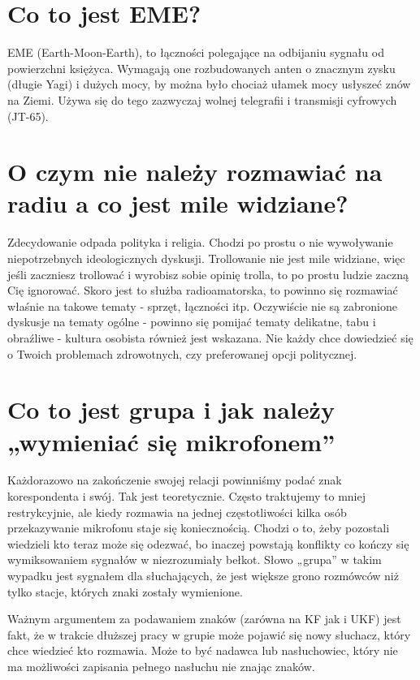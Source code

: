 \documentclass[a4paper,12pt]{article}
\begin{document}
\section{Co to jest EME?}
EME (Earth-Moon-Earth), to łączności polegające na odbijaniu sygnału od powierzchni księżyca. Wymagają one rozbudowanych anten o znacznym zysku (długie Yagi) i dużych mocy, by można było chociaż ułamek mocy usłyszeć znów na Ziemi. Używa się do tego zazwyczaj wolnej telegrafii i transmisji cyfrowych (JT-65).

\section{O czym nie należy rozmawiać na radiu a co jest mile widziane?}
Zdecydowanie odpada polityka i religia. Chodzi po prostu o nie wywoływanie niepotrzebnych ideologicznych dyskusji. Trollowanie nie jest mile widziane, więc jeśli zaczniesz trollować i wyrobisz sobie opinię trolla, to po prostu ludzie zaczną Cię ignorować.
Skoro jest to służba radioamatorska, to powinno się rozmawiać właśnie na takowe tematy - sprzęt, łączności itp. Oczywiście nie są zabronione dyskusje na tematy ogólne - powinno się pomijać tematy delikatne, tabu i obraźliwe - kultura osobista również jest wskazana. Nie każdy chce dowiedzieć się o Twoich problemach zdrowotnych, czy preferowanej opcji politycznej.

\section{Co to jest grupa i jak należy „wymieniać się mikrofonem”}
Każdorazowo na zakończenie swojej relacji powinniśmy podać znak korespondenta i swój. Tak jest teoretycznie. Często traktujemy to mniej restrykcyjnie, ale kiedy rozmawia na jednej częstotliwości kilka osób przekazywanie mikrofonu staje się koniecznością. Chodzi o to, żeby pozostali wiedzieli kto teraz może się odezwać, bo inaczej powstają konflikty co kończy się wymiksowaniem sygnałów w niezrozumiały bełkot. Słowo „grupa” w takim wypadku jest sygnałem dla słuchających, że jest większe grono rozmówców niż tylko stacje, których znaki zostały wymienione.

Ważnym argumentem za podawaniem znaków (zarówna na KF jak i UKF) jest fakt, że w trakcie dłuższej pracy w grupie może pojawić się nowy słuchacz, który chce wiedzieć kto rozmawia. Może to być nadawca lub nasłuchowiec, który nie ma możliwości zapisania pełnego nasłuchu nie znając znaków.
\end{document}
